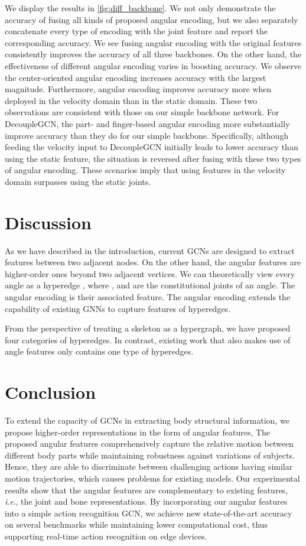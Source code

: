 \documentclass[journal,comsoc]{IEEEtran}
\newcommand{\ie}{\textit{i}.\textit{e}.,}
\begin{document}
We display the results in \autoref{fig:diff_backbone}. We not only demonstrate the accuracy of fusing all kinds of proposed angular encoding, but we also separately concatenate every type of encoding with the joint feature and report the corresponding accuracy. We see fusing angular encoding with the original features consistently improves the accuracy of all three backbones. On the other hand, the effectiveness of different angular encoding varies in boosting accuracy. We observe the center-oriented angular encoding increases accuracy with the largest magnitude. Furthermore, angular encoding improves accuracy more when deployed in the velocity domain than in the static domain. These two observations are consistent with those on our simple backbone network. For DecoupleGCN, the part- and finger-based angular encoding more substantially improve accuracy than they do for our simple backbone. Specifically, although feeding the velocity input to DecoupleGCN initially leads to lower accuracy than using the static feature, the situation is reversed after fusing with these two types of angular encoding. 
These scenarios imply that using features in the velocity domain surpasses using the static joints. 

    \section{Discussion}

As we have described in the introduction, current GCNs are designed to extract features between two adjacent nodes. On the other hand, the angular features are higher-order ones beyond two adjacent vertices. We can theoretically view every angle as a hyperedge , where ,  and  are the constitutional joints of an angle. The angular encoding is their associated feature. The angular encoding extends the capability of existing GNNs to capture features of hyperedges. 

From the perspective of treating a skeleton as a hypergraph, we have proposed four categories of hyperedges. In contrast, existing work that also makes use of angle features only contains one type of hyperedges.  \section{Conclusion}

To extend the capacity of GCNs in extracting body structural information, we propose higher-order representations in the form of angular features, 
The proposed angular features comprehensively capture the relative motion between different body parts while maintaining robustness against variations of subjects. Hence, they are able to
discriminate between challenging actions having similar motion trajectories, which causes problems for existing models. Our experimental results show that the angular features are complementary to existing features, \ie{} the joint and bone representations. By incorporating our angular features into a simple action recognition GCN, we achieve new state-of-the-art accuracy on several benchmarks while maintaining lower computational cost, thus supporting real-time action recognition on edge devices.
 


\end{document}
